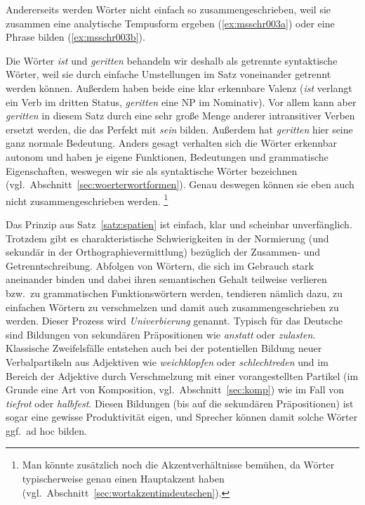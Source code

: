 Andererseits werden Wörter nicht einfach so zusammengeschrieben, \zB weil sie zusammen eine analytische Tempusform ergeben (\ref{ex:msschr003a}) oder eine Phrase bilden (\ref{ex:msschr003b}).

\begin{exe}
  \ex\label{ex:msschr003} 
  \begin{xlist}
  \end{xlist}
\end{exe}

Die Wörter \textit{ist} und \textit{geritten} behandeln wir \zB deshalb als getrennte syntaktische Wörter, weil sie durch einfache Umstellungen im Satz voneinander getrennt werden können.
Außerdem haben beide eine klar erkennbare Valenz (\textit{ist} verlangt ein Verb im dritten Status, \textit{geritten} eine NP im Nominativ).
Vor allem kann aber \textit{geritten} in diesem Satz durch eine sehr große Menge anderer intransitiver Verben ersetzt werden, die das Perfekt mit \textit{sein} bilden.
Außerdem hat \textit{geritten} hier seine ganz normale Bedeutung.
Anders gesagt verhalten sich die Wörter erkennbar autonom und haben je eigene Funktionen, Bedeutungen und grammatische Eigenschaften, weswegen wir sie als syntaktische Wörter bezeichnen (vgl.\ Abschnitt~\ref{sec:woerterwortformen}).
Genau deswegen können sie eben auch nicht zusammengeschrieben werden.%
\footnote{Man könnte zusätzlich noch die Akzentverhältnisse bemühen, da Wörter typischerweise genau einen Hauptakzent haben (vgl.\ Abschnitt~\ref{sec:wortakzentimdeutschen}).}

Das Prinzip aus Satz~\ref{satz:spatien} ist einfach, klar und scheinbar unverfänglich.
Trotzdem gibt es charakteristische Schwierigkeiten in der Normierung (und sekundär in der Orthographievermittlung) bezüglich der Zusammen- und Getrenntschreibung.
Abfolgen von Wörtern, die sich im Gebrauch stark aneinander binden und dabei ihren semantischen Gehalt teilweise verlieren bzw.\ zu grammatischen Funktionswörtern werden, tendieren nämlich dazu, zu einfachen Wörtern zu verschmelzen und damit auch zusammengeschrieben zu werden.
Dieser Prozess wird \textit{Univerbierung} genannt.
Typisch für das Deutsche sind \zB Bildungen von sekundären Präpositionen wie \textit{anstatt} oder \textit{zulasten}.
Klassische Zweifelsfälle entstehen auch bei der potentiellen Bildung neuer Verbalpartikeln aus Adjektiven wie \textit{weichklopfen} oder \textit{schlechtreden} und im Bereich der Adjektive durch Verschmelzung mit einer vorangestellten Partikel (im Grunde eine Art von Komposition, vgl.\ Abschnitt~\ref{sec:komp}) wie im Fall von \textit{tiefrot} oder \textit{halbfest}.
Diesen Bildungen (bis auf die sekundären Präpositionen) ist sogar eine gewisse Produktivität eigen, und Sprecher können damit solche Wörter ggf.\ ad hoc bilden.

